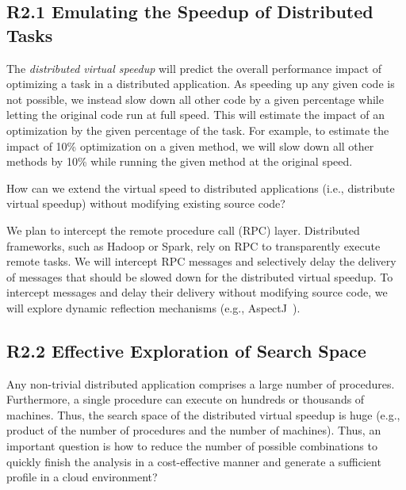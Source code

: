 \subsection{R2.1 Emulating the Speedup of Distributed Tasks}
\label{sub:virtspeedup}
The {\em distributed virtual speedup} will predict the overall performance
impact of optimizing a task in a distributed application.
As speeding up any given code is not possible, we instead slow down all other
code by a given percentage while letting the original code run at full
speed.
This will estimate the impact of an optimization by the given percentage of the
task. For example, to estimate the impact of 10\% optimization
on a given method, we will slow down all other methods by 10\% while
running the given method at the original speed.

\boxbeg
\begin{Challenge}
  How can we extend the virtual speed to distributed applications
  (i.e., distribute virtual speedup) without modifying existing source
  code?
\end{Challenge}
\boxend

We plan to intercept the remote procedure call (RPC) layer.
Distributed frameworks, such as Hadoop or Spark, rely on RPC to
transparently execute remote tasks. We will intercept RPC messages and
selectively delay the delivery of messages that should be slowed
down for the distributed virtual speedup. To intercept messages and
delay their delivery without modifying source code, we will explore
dynamic reflection mechanisms (e.g.,
AspectJ~\cite{aspectj-introduction, aspectj:ecoop01}).


\subsection{R2.2 Effective Exploration of Search Space}
\label{sub:statereduction}
\boxbeg
\begin{Challenge}
Any non-trivial distributed application comprises a large
number of procedures. Furthermore, a single procedure can execute on
hundreds or thousands of machines. Thus, the search space of the
distributed virtual speedup is huge (e.g., product of the number of
procedures and the number of machines).
Thus, an important question is how to reduce the number of
possible combinations to quickly finish the analysis in a cost-effective
manner and generate a sufficient profile in a cloud environment?
\end{Challenge}
\boxend

